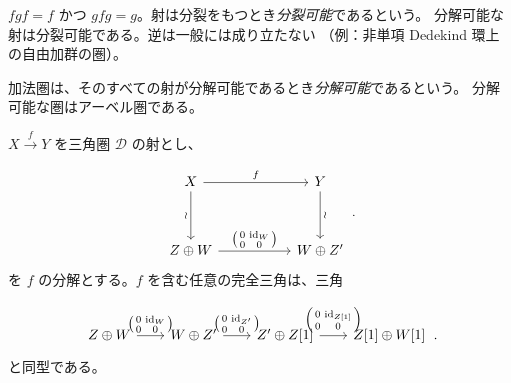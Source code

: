 \clearpage
{}%
\begingroup
\small
\setlength{\abovedisplayskip}{4pt plus 2pt minus 2pt}%
\setlength{\belowdisplayskip}{4pt plus 2pt minus 2pt}%

$fgf=f$ かつ $gfg=g$。射は分裂をもつとき\emph{分裂可能}であるという。
分解可能な射は分裂可能である。逆は一般には成り立たない
（例：非単項 Dedekind 環上の自由加群の圏）。

加法圏は、そのすべての射が分解可能であるとき\emph{分解可能}であるという。
分解可能な圏はアーベル圏である。

$X\xrightarrow{f}Y$ を三角圏 $\mathcal D$ の射とし、

\begin{equation*}
  \begin{tikzcd}[ampersand replacement=\&,column sep=5.2em,row sep=3.4em]
    X \arrow[r,"f"] \arrow[d,"\wr"']
      \& Y \arrow[d,"\wr"] \\
    Z\oplus W
      \arrow[r,"{\left(\begin{smallmatrix}0&\operatorname{id}_W\\0&0\end{smallmatrix}\right)}"]
      \& W\oplus Z'
  \end{tikzcd}\,.
\end{equation*}
を $f$ の分解とする。$f$ を含む任意の完全三角は、三角

\begin{equation*}
  \begin{tikzcd}[ampersand replacement=\&,column sep=2.0em]
    Z\oplus W
      \arrow[r,"{\left(\begin{smallmatrix}0&\operatorname{id}_W\\0&0\end{smallmatrix}\right)}"]
      \& W\oplus Z'
      \arrow[r,"{\left(\begin{smallmatrix}0&\operatorname{id}_{Z'}\\0&0\end{smallmatrix}\right)}"]
      \& Z'\oplus Z[1]
      \arrow[r,"{\left(\begin{smallmatrix}0&\operatorname{id}_{Z[1]}\\0&0\end{smallmatrix}\right)}"]
      \& Z[1]\oplus W[1]
  \end{tikzcd}\,.
\end{equation*}
と同型である。

